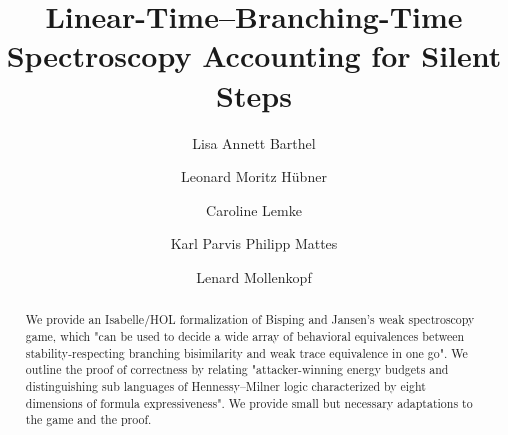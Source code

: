 \documentclass[11pt,a4paper]{article}
\begin{document}
\title{Linear-Time--Branching-Time Spectroscopy Accounting for Silent Steps}
\author{Lisa Annett Barthel \and Leonard Moritz Hübner \and Caroline Lemke \and Karl Parvis Philipp Mattes \and Lenard Mollenkopf}
\maketitle

\begin{abstract}
We provide an Isabelle/HOL formalization of Bisping and Jansen's \cite{bisping2023lineartimebranchingtime} weak spectroscopy game, which "can be used to decide a wide
array of behavioral equivalences between stability-respecting branching bisimilarity and weak trace equivalence in one go". 
We outline the proof of correctness by relating "attacker-winning energy budgets and distinguishing sub 
languages of Hennessy–Milner logic characterized by eight dimensions of formula expressiveness". 
We provide small but necessary adaptations to the game and the proof.
\end{abstract}

\tableofcontents


















\newpage
\appendix




\end{document}
